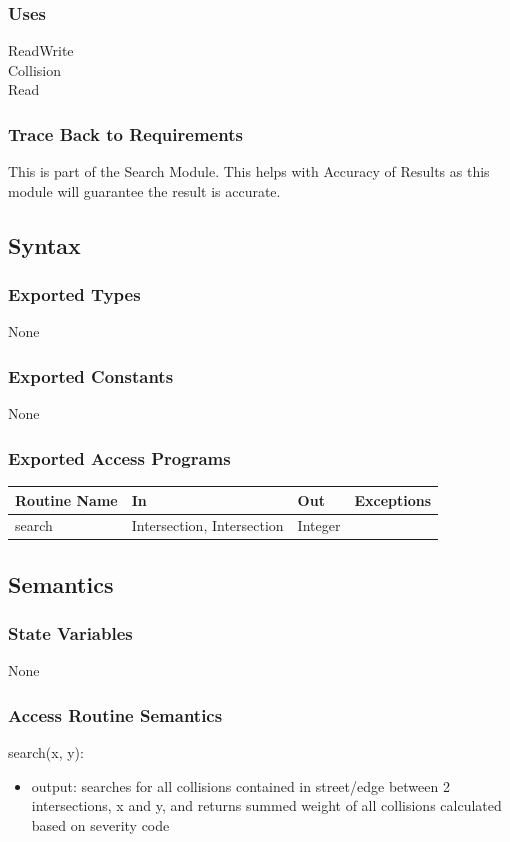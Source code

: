 \documentclass[12pt]{article}
\begin{document}
\subsubsection*{Uses}
ReadWrite\\
Collision\\
Read

\subsubsection*{Trace Back to Requirements}
This is part of the Search Module. This helps with Accuracy of Results as this module will guarantee the result is accurate.

\subsection*{Syntax}
\subsubsection*{Exported Types}
None

\subsubsection*{Exported Constants}
None

\subsubsection*{Exported Access Programs}
    \begin{tabular}{|l|l|l|l|}
    \hline
    \textbf{Routine Name} & \textbf{In} & \textbf{Out} & \textbf{Exceptions}\\
    \hline
    search & Intersection, Intersection & Integer & ~\\
    \hline
    \end{tabular}
    
\subsection*{Semantics}
\subsubsection*{State Variables}
None

\newpage
\subsubsection*{Access Routine Semantics}
\noindent search(x, y):
\begin{itemize}
    \item output: searches for all collisions contained in street/edge between 2 intersections, x and y, and returns summed weight of all collisions calculated based on severity code
\end{itemize}
\end{document}
